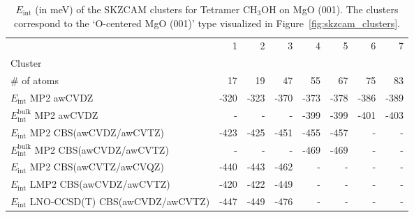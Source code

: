 \begin{table}
\caption{\label{tab:system_eint_mgo_ch3oh_tetramer}$E_\textrm{int}$ (in meV) of the SKZCAM clusters for Tetramer CH$_3$OH on MgO (001). The clusters correspond to the `O-centered MgO (001)' type visualized in Figure~\ref{fig:skzcam_clusters}.}
\begin{adjustbox}{center,max width=1.4\textwidth}
\begin{tabular}{lrrrrrrr}
\toprule
 & 1 & 2 & 3 & 4 & 5 & 6 & 7 \\ 
Cluster &  &  &  &  &  &  &  \\
\midrule
\# of atoms & 17 & 19 & 47 & 55 & 67 & 75 & 83 \\
$E_\textrm{int}$ MP2 awCVDZ & -320 & -323 & -370 & -373 & -378 & -386 & -389 \\
$E_\textrm{int}^\textrm{bulk}$ MP2 awCVDZ & - & - & - & -399 & -399 & -401 & -403 \\
$E_\textrm{int}$ MP2 CBS(awCVDZ/awCVTZ) & -423 & -425 & -451 & -455 & -457 & - & - \\
$E_\textrm{int}^\textrm{bulk}$ MP2 CBS(awCVDZ/awCVTZ) & - & - & - & -469 & -469 & - & - \\
$E_\textrm{int}$ MP2 CBS(awCVTZ/awCVQZ) & -440 & -443 & -462 & - & - & - & - \\
$E_\textrm{int}$ LMP2 CBS(awCVDZ/awCVTZ) & -420 & -422 & -449 & - & - & - & - \\
$E_\textrm{int}$ LNO-CCSD(T) CBS(awCVDZ/awCVTZ) & -447 & -449 & -476 & - & - & - & - \\
\bottomrule
\end{tabular}
\end{adjustbox}
\end{table}

